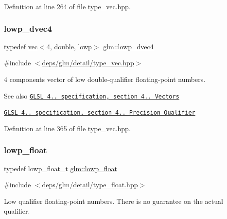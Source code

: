 Definition at line 264 of file type\+\_\+vec.\+hpp.

\mbox{\label{group__core__precision_gae88de6eaf7152399bdbc2687a76407c4}} 
\subsubsection{\texorpdfstring{lowp\+\_\+dvec4}{lowp\_dvec4}}
{\footnotesize\ttfamily typedef \hyperlink{structglm_1_1vec}{vec}$<$4, double, lowp$>$ \hyperlink{group__core__precision_gae88de6eaf7152399bdbc2687a76407c4}{glm\+::lowp\+\_\+dvec4}}



{\ttfamily \#include $<$\hyperlink{type__vec_8hpp}{deps/glm/detail/type\+\_\+vec.\+hpp}$>$}

4 components vector of low double-\/qualifier floating-\/point numbers.

\begin{DoxySeeAlso}{See also}
\href{http://www.opengl.org/registry/doc/GLSLangSpec.4.20.8.pdf}{\tt G\+L\+SL 4.. specification, section 4.. Vectors} 

\href{http://www.opengl.org/registry/doc/GLSLangSpec.4.20.8.pdf}{\tt G\+L\+SL 4.. specification, section 4.. Precision Qualifier} 
\end{DoxySeeAlso}


Definition at line 365 of file type\+\_\+vec.\+hpp.

\mbox{\label{group__core__precision_ga2887fbc729ac5c1c5caeb7cd57a7145c}} 
\subsubsection{\texorpdfstring{lowp\+\_\+float}{lowp\_float}}
{\footnotesize\ttfamily typedef lowp\+\_\+float\+\_\+t \hyperlink{group__core__precision_ga2887fbc729ac5c1c5caeb7cd57a7145c}{glm\+::lowp\+\_\+float}}



{\ttfamily \#include $<$\hyperlink{type__float_8hpp}{deps/glm/detail/type\+\_\+float.\+hpp}$>$}

Low qualifier floating-\/point numbers. There is no guarantee on the actual qualifier.

